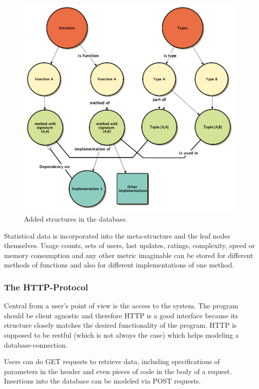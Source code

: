 \documentclass[twoside, 11pt]{scrartcl}
\begin{document}
\begin{figure}[h!]		
 	\includegraphics[scale=0.4]{figures/dbStructure2.png}
	\caption{Added structures in the database.}
	\label{fig:dbStructure2}
\end{figure}

Statistical data is incorporated into the meta-structure and the leaf nodes themselves. Usage counts, sets of users, last updates, ratings, complexity, speed or memory consumption and any other metric imaginable can be stored for different methods of functions and also for different implementations of one method.

\subsubsection{The HTTP-Protocol}
Central from a user's point of view is the access to the system. The program should be client agnostic and therefore  HTTP is a good interface because its structure closely matches the desired functionality of the program. HTTP is supposed to be restful (which is not always the case) which helps modeling a database-connection.

Users can do GET requests to retrieve data, including specifications of parameters in the header and even pieces of code in the body of a request. Insertions into the database can be modeled via POST requests. 
\end{document}
